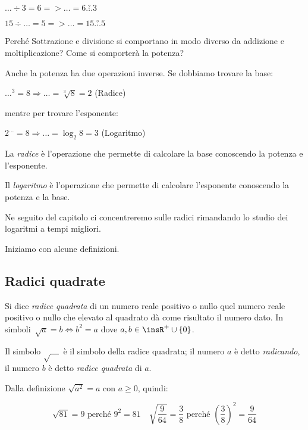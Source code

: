 \(\dots \div 3 = 6 => \dots = 6 \overset{?}{\dots} 3\)

\(15 \div \dots = 5 => \dots = 15 \overset{?}{\dots} 5\)

Perché Sottrazione e divisione si comportano in modo diverso da addizione e 
moltiplicazione? Come si comporterà la potenza?

Anche la potenza ha due operazioni inverse. Se dobbiamo trovare la base:

\(\dots ^3 = 8 \Rightarrow \dots = \sqrt[3]{8} = 2\) (Radice)

mentre per trovare l'esponente:

\(2 ^{\dots} = 8 \Rightarrow \dots = \log_{2}{8} = 3\) (Logaritmo)

\begin{definizione}
La \emph{radice} è l'operazione che permette di calcolare la base conoscendo
la potenza e l'esponente.
\end{definizione}

\begin{definizione}
Il \emph{logaritmo} è l'operazione che permette di calcolare l'esponente
conoscendo la potenza e la base.
\end{definizione}

Ne seguito del capitolo ci concentreremo sulle radici rimandando lo studio
dei logaritmi a tempi migliori. 

Iniziamo con alcune definizioni.

\subsection{Radici quadrate}

\begin{definizione}
Si dice \emph{radice quadrata} di un numero reale positivo o nullo quel numero 
reale positivo o nullo che elevato al quadrato dà come risultato il numero dato.
In simboli~\(\sqrt a=b \Leftrightarrow b^2=a\) dove \(a,b\in \insR^{+} \cup \{0\}\).
\end{definizione}

Il simbolo \(\sqrt{\quad}\) è il simbolo della radice quadrata; 
il numero \(a\) è detto \emph{radicando}, 
il numero \(b\) è detto \emph{radice quadrata} di \(a\).

Dalla definizione \(\sqrt{a^2}=a\) con \(a\ge 0\), quindi: 

\[\sqrt{81}=9 \text{ perché } 9^2=81 \quad 
\sqrt{\frac {9}{64}}=\frac{3}{8}
\text{ perché } \left(\frac 3 8\right)^2=\frac 9{64}\]

